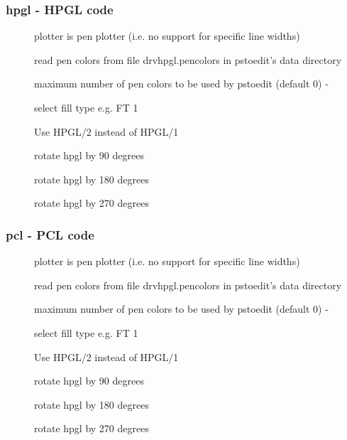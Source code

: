 \documentclass[english,a4paper]{article}
\begin{document}
\subsubsection{hpgl - HPGL code}
\begin{description}
\item[]
plotter is pen plotter (i.e. no support for specific line widths)


\item[]
read pen colors from file drvhpgl.pencolors in pstoedit's data directory


\item[]
maximum number of pen colors to be used by pstoedit (default 0) -


\item[]
select fill type e.g. FT 1


\item[]
Use HPGL/2 instead of HPGL/1


\item[]
rotate hpgl by 90 degrees


\item[]
rotate hpgl by 180 degrees


\item[]
rotate hpgl by 270 degrees


\end{description}
\subsubsection{pcl - PCL code}
\begin{description}
\item[]
plotter is pen plotter (i.e. no support for specific line widths)


\item[]
read pen colors from file drvhpgl.pencolors in pstoedit's data directory


\item[]
maximum number of pen colors to be used by pstoedit (default 0) -


\item[]
select fill type e.g. FT 1


\item[]
Use HPGL/2 instead of HPGL/1


\item[]
rotate hpgl by 90 degrees


\item[]
rotate hpgl by 180 degrees


\item[]
rotate hpgl by 270 degrees


\end{description}
\end{document}
